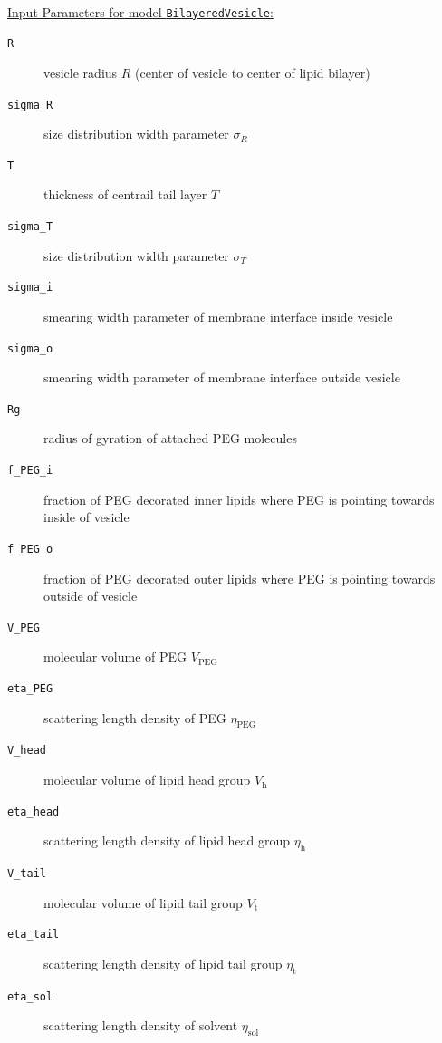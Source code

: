 \vspace{5mm}
\hspace{1pt}\\
\uline{Input Parameters for model \texttt{BilayeredVesicle}:}\\
\begin{description}
\item[\texttt{R}] vesicle radius $R$ (center of vesicle to center of lipid bilayer)
\item[\texttt{sigma\_R}] size distribution width parameter $\sigma_{R}$
\item[\texttt{T}] thickness of centrail tail layer $T$
\item[\texttt{sigma\_T}] size distribution width parameter $\sigma_T$
\item[\texttt{sigma\_i}] smearing width parameter of membrane interface inside vesicle
\item[\texttt{sigma\_o}] smearing width parameter of membrane interface outside vesicle
\item[\texttt{Rg}] radius of gyration of attached PEG molecules
\item[\texttt{f\_PEG\_i}] fraction of PEG decorated inner lipids where PEG is pointing towards inside of vesicle
\item[\texttt{f\_PEG\_o}] fraction of PEG decorated outer lipids where PEG is pointing towards outside of vesicle
\item[\texttt{V\_PEG}] molecular volume of PEG $V_\text{PEG}$
\item[\texttt{eta\_PEG}] scattering length density of PEG $\eta_\text{PEG}$
\item[\texttt{V\_head}] molecular volume of lipid head group $V_\text{h}$
\item[\texttt{eta\_head}] scattering length density of lipid head group $\eta_\text{h}$
\item[\texttt{V\_tail}] molecular volume of lipid tail group $V_\text{t}$
\item[\texttt{eta\_tail}] scattering length density of lipid tail group $\eta_\text{t}$
\item[\texttt{eta\_sol}] scattering length density of solvent $\eta_\text{sol}$
\end{description} 